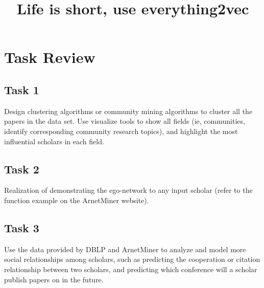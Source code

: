 \documentclass[conference]{IEEEtran}
\begin{document}
\title{Life is short, use everything2vec}
\author{
\and
{}
\and
{}
}
\maketitle
\IEEEpeerreviewmaketitle
\section{Task Review}
\subsection{Task 1}
Design clustering algorithms or community mining algorithms to cluster all the papers in the data set. Use visualize tools to show all fields (ie, communities, identify corresponding community research topics), and highlight the most influential scholars in each field.
\subsection{Task 2}
Realization of demonstrating the ego-network to any input scholar (refer to the function example on the ArnetMiner website).
\subsection{Task 3}
Use the data provided by DBLP and ArnetMiner to analyze and model more social relationships among scholars, such as predicting the cooperation or citation relationship between two scholars, and predicting which conference will a scholar publish papers on in the future.
\end{document}
